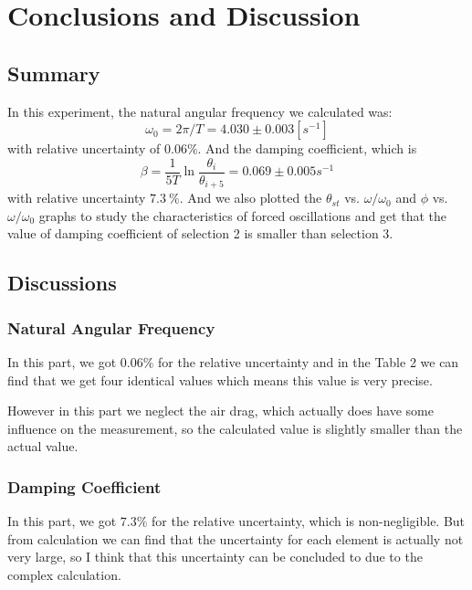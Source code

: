 \documentclass[12pt,a4paper]{article}
\begin{document}
\section{Conclusions and Discussion}
\subsection{Summary}
\qquad In this experiment, the natural angular frequency we calculated was:
\begin{equation}
    \omega_0=2\pi/T=4.030\pm 0.003[s^{-1}]
    \nonumber
\end{equation}
with relative uncertainty of $0.06\%$. And the damping coefficient, which is                    
\begin{equation}
    \beta=\frac{1}{5T}\ln{\frac{\theta_i}{\theta_{i+5}}}=0.069\pm0.005s^{-1}
    \nonumber
\end{equation}
with relative uncertainty $7.3\ \%$. And we also plotted the $\theta_{st}$ vs. $\omega/\omega_0$
and $\phi$ vs. $\omega/\omega_0$ graphs to study the characteristics of forced oscillations and get that the value of damping coefficient of selection 2 is smaller than selection 3.
\subsection{Discussions}
\subsubsection{Natural Angular Frequency}
\qquad In this part, we got $0.06\%$ for the relative uncertainty and in the Table 2
we can find that we get four identical values which means this value is very precise.
\par However in this part we neglect the air drag, which actually does have some influence
on the measurement, so the calculated value is slightly smaller than the actual value.
\subsubsection{Damping Coefficient}
\qquad In this part, we got $7.3\%$ for the relative uncertainty, which is non-negligible.
But from calculation we can find that the uncertainty for each element is actually not very large, so 
I think that this uncertainty can be concluded to due to the complex calculation.
\end{document}
